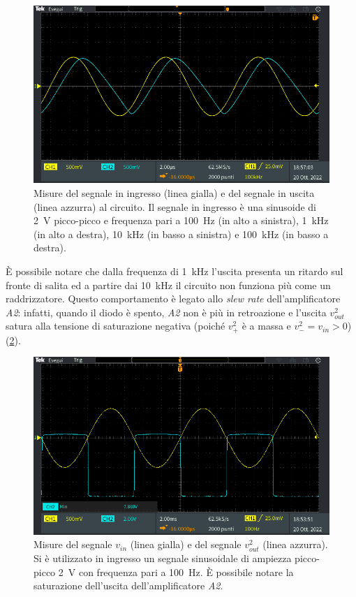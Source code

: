 \begin{figure}[h]
\begin{minipage}{.496\textwidth}
	\end{minipage}
	\begin{minipage}{.496\textwidth}
		\includegraphics[width=\linewidth]{./ImageFiles/Laboratorio 3/TEK00005.PNG}
	\end{minipage}
	\caption{Misure del segnale in ingresso (linea gialla) e del segnale in uscita (linea azzurra) al circuito. Il segnale in ingresso è una sinusoide di \SI{2}{\volt} picco-picco e frequenza pari a \SI{100}{\hertz} (in alto a sinistra), \SI{1}{\kilo\hertz} (in alto a destra), \SI{10}{\kilo\hertz} (in basso a sinistra) e \SI{100}{\kilo\hertz} (in basso a destra).}
	\label{fig:uscita_freq_circuito_1}
\end{figure}
\`E possibile notare che dalla frequenza di \SI{1}{\kilo\hertz} l'uscita presenta un ritardo sul fronte di salita ed a partire dai \SI{10}{\kilo\hertz} il circuito non funziona più come un raddrizzatore. Questo comportamento è legato allo \textit{slew rate} dell'amplificatore \textit{A2}: infatti, quando il diodo è spento, \textit{A2} non è più in retroazione e l'uscita $v_{out}^2$ satura alla tensione di saturazione negativa (poiché $v_+^2$ è a massa e $v_-^2=v_{in}>0$) (\Fig\ref{fig:uscita_sat_circuito_1}).
\begin{figure}[h]
	\centering
	\includegraphics[width=\linewidth]{./ImageFiles/Laboratorio 3/TEK00002.PNG}
	\caption{Misure del segnale $v_{in}$ (linea gialla) e del segnale $v_{out}^2$ (linea azzurra). Si è utilizzato in ingresso un segnale sinusoidale di ampiezza picco-picco \SI{2}{\volt} con frequenza pari a \SI{100}{\hertz}. \`E possibile notare la saturazione dell'uscita dell'amplificatore \textit{A2}.}
	\label{fig:uscita_sat_circuito_1}
\end{figure}
